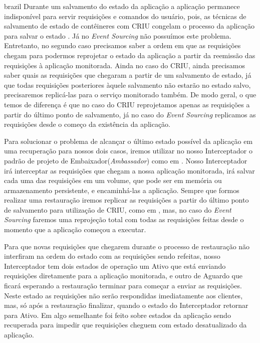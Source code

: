 \begin{otherlanguage*}{brazil}
Durante um salvamento do estado da aplicação a aplicação permanece indisponível para
servir requisições e comandos do usuário, pois, as técnicas de salvamento de estado
de contêineres com CRIU congelam o processo da aplicação para salvar o estado
\cite{vayghan2021kubernetes}. Já no \textit{Event Sourcing} não possuímos este problema.
Entretanto, no segundo caso precisamos saber a ordem em que as requisições chegam para
podermos reprojetar o estado da aplicação a partir da reemissão das requisições à aplicação
monitorada. Ainda no caso do CRIU, ainda precisamos saber quais as requisições que chegaram
a partir de um salvamento de estado, já que todas requisições posteriores àquele salvamento
não estarão no estado salvo, precisaremos replicá-las para o serviço monitorado também. De
modo geral, o que temos de diferença é que no caso do CRIU reprojetamos apenas as requisições
a partir do último ponto de salvamento, já no caso do \textit{Event Sourcing} replicamos
as requisições desde o começo da existência da aplicação.

Para solucionar o problema de alcançar o último estado possível da aplicação em uma
recuperação para nossos dois casos, iremos utilizar no nosso Interceptador o padrão de projeto
de Embaixador(\textit{Ambassador}) como em \cite{muller2022architecture}. Nosso Interceptador
irá interceptar as requisições que chegam a nossa aplicação monitorada, irá salvar cada uma
das requisições em um volume, que pode ser em memória ou armazenamento persistente, e
encaminhá-las a aplicação. Sempre que formos realizar uma restauração iremos replicar as
requisições a partir do último ponto de salvamento para utilização de CRIU, como em 
\cite{muller2022architecture}, mas, no caso do \textit{Event Sourcing} faremos uma
reprojeção total com todas as requisições feitas desde o momento que a aplicação começou a
executar.

Para que novas requisições que chegarem durante o processo de restauração não interfiram na
ordem do estado com as requisições sendo refeitas, nosso Interceptador tem dois estados de
operação um Ativo que está enviando requisições diretamente para a aplicação monitorada, e
outro de Aguardo que ficará esperando a restauração terminar para começar a enviar as
requisições. Neste estado as requisições não serão respondidas imediatamente aos clientes,
mas, só após a restauração finalizar, quando o estado do Interceptador retornar para Ativo.
Em \cite{vayghan2021kubernetes} algo semelhante foi feito sobre estados da aplicação sendo
recuperada para impedir que requisições cheguem com estado desatualizado da aplicação.


\end{otherlanguage*}
